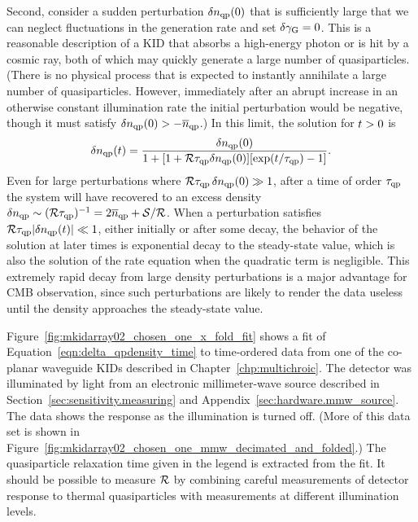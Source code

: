 Second, consider a sudden perturbation $\delta n_{\mathrm{qp}}(0)$ that is sufficiently large that we can neglect fluctuations in the generation rate and set
$\delta\gamma_{\mathrm{G}} = 0$.
This is a reasonable description of a KID that absorbs a high-energy photon or is hit by a cosmic ray, both of which may quickly generate a large number of quasiparticles.
(There is no physical process that is expected to instantly annihilate a large number of quasiparticles.
However, immediately after an abrupt increase in an otherwise constant illumination rate the initial perturbation would be negative, though it must satisfy
$\delta n_{\mathrm{qp}}(0) > -\overline{n}_{\mathrm{qp}}$.)
In this limit, the solution for $t > 0$ is 
\begin{equation}
\delta n_{\mathrm{qp}}(t)
  =
  \frac{\delta n_{\mathrm{qp}}(0)}
  {1 + [1 + \mathcal{R} \tau_{\mathrm{qp}} \delta n_{\mathrm{qp}}(0)] 
  [\exp(t / \tau_{\mathrm{qp}}) - 1]}.
\label{eqn:delta_qpdensity_time}
\end{equation}
Even for large perturbations where $\mathcal{R} \tau_{\mathrm{qp}} \, \delta n_{\mathrm{qp}}(0) \gg 1$, after a time of order $\tau_{\mathrm{qp}}$ the system will have recovered to an excess density $\delta n_{\mathrm{qp}} \sim (\mathcal{R} \tau_{\mathrm{qp}})^{-1} = 2 \overline{n}_{\mathrm{qp}} + \mathcal{S} / \mathcal{R}$.
When a perturbation satisfies
$\mathcal{R} \tau_{\mathrm{qp}} |\delta n_{\mathrm{qp}}(t)| \ll 1$,
either initially or after some decay, the behavior of the solution at later times is exponential decay to the steady-state value, which is also the solution of the rate equation when the quadratic term is negligible.
This extremely rapid decay from large density perturbations is a major advantage for CMB observation, since such perturbations are likely to render the data useless until the density approaches the steady-state value.

Figure~\ref{fig:mkidarray02_chosen_one_x_fold_fit} shows a fit of Equation~\ref{eqn:delta_qpdensity_time} to time-ordered data from one of the co-planar waveguide KIDs described in Chapter~\ref{chp:multichroic}.
The detector was illuminated by light from an electronic millimeter-wave source described in Section~\ref{sec:sensitivity.measuring} and Appendix~\ref{sec:hardware.mmw_source}.
The data shows the response as the illumination is turned off.
(More of this data set is shown in Figure~\ref{fig:mkidarray02_chosen_one_mmw_decimated_and_folded}.)
The quasiparticle relaxation time given in the legend is extracted from the fit.
It should be possible to measure $\mathcal{R}$ by combining careful measurements of detector response to thermal quasiparticles with measurements at different illumination levels.

